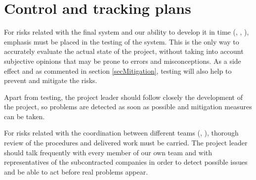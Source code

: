 \section{Control and tracking plans}

For risks related with the final system and our ability to develop it in time (, , ), emphasis must be placed in the testing of the system. This is the only way to accurately evaluate the actual state of the project, without taking into account subjective opinions that may be prone to errors and misconceptions. As a side effect and as commented in section \ref{secMitigation}, testing will also help to prevent and mitigate the risks.

Apart from testing, the project leader should follow closely the development of the project, so problems are detected as soon as possible and mitigation measures can be taken.

For risks related with the coordination between different teams (, ), thorough review of the procedures and delivered work must be carried. The project leader should talk frequently with every member of our own team and with representatives of the subcontracted companies in order to detect possible issues and be able to act before real problems appear.
